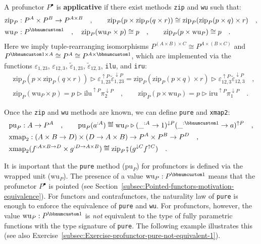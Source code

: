 A profunctor $P^{\bullet}$ is \textbf{applicative} if there exist
methods \lstinline!zip! and \lstinline!wu! such that:
\begin{align*}
 & \text{zip}_{P}:P^{A}\times P^{B}\rightarrow P^{A\times B}\quad,\quad\quad\text{zip}_{P}(p\times\text{zip}_{P}(q\times r))\cong\text{zip}_{P}(\text{zip}_{P}(p\times q)\times r)\quad,\\
 & \text{wu}_{P}:P^{\bbnum 1}\quad,\quad\text{zip}_{P}(\text{wu}_{P}\times p)\cong p\quad,\quad\quad\text{zip}_{P}(p\times\text{wu}_{P})\cong p\quad.
\end{align*}
Here we imply tuple-rearranging isomorphisms $P^{(A\times B)\times C}\cong P^{A\times(B\times C)}$
and $P^{\bbnum 1\times A}\cong P^{A}\cong P^{A\times\bbnum 1}$, which
are implemented via the functions $\varepsilon_{1,23}$, $\varepsilon_{12,3}$,
$\tilde{\varepsilon}_{1,23}$, $\tilde{\varepsilon}_{12,3}$, \lstinline!ilu!,
and \lstinline!iru!:
\begin{align*}
 & \text{zip}_{P}(p\times\text{zip}_{P}(q\times r))\triangleright\varepsilon_{1,23}^{\uparrow P}\tilde{\varepsilon}_{1,23}^{\downarrow P}=\text{zip}_{P}(\text{zip}_{P}(p\times q)\times r)\triangleright\varepsilon_{12,3}^{\uparrow P}\tilde{\varepsilon}_{12,3}^{\downarrow P}\quad,\\
 & \text{zip}_{P}(\text{wu}_{P}\times p)=p\triangleright\text{ilu}^{\uparrow P}\pi_{2}^{\downarrow P}\quad,\quad\quad\text{zip}_{P}(p\times\text{wu}_{P})=p\triangleright\text{iru}^{\uparrow P}\pi_{1}^{\downarrow P}\quad.
\end{align*}

Once the \lstinline!zip! and \lstinline!wu! methods are known, we
can define \lstinline!pure! and \lstinline!xmap2!:
\begin{align*}
 & \text{pu}_{P}:A\rightarrow P^{A}\quad,\quad\quad\text{pu}_{P}(a^{:A})\triangleq\text{wu}_{P}\triangleright(\_^{:A}\rightarrow1)^{\downarrow P}(\_^{:\bbnum 1}\rightarrow a)^{\uparrow P}\quad,\\
 & \text{xmap}_{2}:(A\times B\rightarrow D)\times(D\rightarrow A\times B)\rightarrow P^{A}\times P^{B}\rightarrow P^{D}\quad,\\
 & \text{xmap}_{2}(f^{:A\times B\rightarrow D}\times g^{:D\rightarrow A\times B})\triangleq\text{zip}_{P}\bef(g^{\downarrow C}f^{\uparrow C})\quad.
\end{align*}

It is important that the \lstinline!pure! method ($\text{pu}_{P}$)
for profunctors is defined via the wrapped unit ($\text{wu}_{P}$).
The presence of a value $\text{wu}_{P}:P^{\bbnum 1}$ means that the
profunctor $P^{\bullet}$ is pointed (see
Section~\ref{subsec:Pointed-functors-motivation-equivalence}). For
functors and contrafunctors, the naturality law of \lstinline!pure!
is enough to enforce the equivalence of \lstinline!pure! and \lstinline!wu!.
For profunctors, however, the value $\text{wu}_{P}:P^{\bbnum 1}$
is \emph{not} equivalent to the type of fully parametric functions
with the type signature of \lstinline!pure!. The following example
illustrates this (see also Exercise~\ref{subsec:Exercise-profunctor-pure-not-equivalent-1}).

